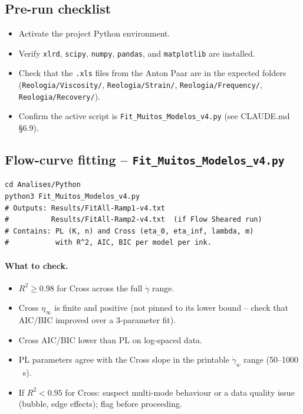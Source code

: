 \documentclass[11pt,a4paper]{article}
\newcommand{\gd}{\dot{\gamma}}
\begin{document}
\subsection{Pre-run checklist}
\begin{itemize}[leftmargin=1.4em,itemsep=1pt]
\item[$\square$] Activate the project Python environment.
\item[$\square$] Verify \texttt{xlrd}, \texttt{scipy}, \texttt{numpy},
  \texttt{pandas}, and \texttt{matplotlib} are installed.
\item[$\square$] Check that the \texttt{.xls} files from the Anton Paar
  are in the expected folders (\texttt{Reologia/Viscosity/},
  \texttt{Reologia/Strain/}, \texttt{Reologia/Frequency/},
  \texttt{Reologia/Recovery/}).
\item[$\square$] Confirm the active script is
  \texttt{Fit\_Muitos\_Modelos\_v4.py} (see CLAUDE.md \S6.9).
\end{itemize}

\subsection{Flow-curve fitting -- \texttt{Fit\_Muitos\_Modelos\_v4.py}}

\begin{lstlisting}[style=shell]
cd Analises/Python
python3 Fit_Muitos_Modelos_v4.py
# Outputs: Results/FitAll-Ramp1-v4.txt
#          Results/FitAll-Ramp2-v4.txt  (if Flow Sheared run)
# Contains: PL (K, n) and Cross (eta_0, eta_inf, lambda, m)
#           with R^2, AIC, BIC per model per ink.
\end{lstlisting}

\paragraph{What to check.}
\begin{itemize}[leftmargin=1.4em,itemsep=1pt]
\item $R^2\geq 0.98$ for Cross across the full $\gd$ range.
\item Cross $\eta_\infty$ is finite and positive (not pinned to its
  lower bound -- check that AIC/BIC improved over a 3-parameter fit).
\item Cross AIC/BIC lower than PL on log-spaced data.
\item PL parameters agree with the Cross slope in the printable
  $\gd_w$ range (50--1000\,\si{\per\s}).
\item If $R^2<0.95$ for Cross: suspect multi-mode behaviour or a
  data quality issue (bubble, edge effects); flag before proceeding.
\end{itemize}
\end{document}
